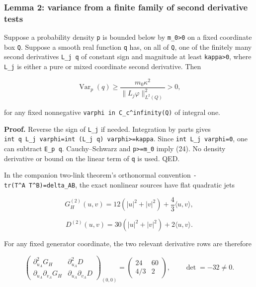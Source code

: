 \documentclass[
  11pt,
]{article}
\begin{document}
\hypertarget{lemma-2-variance-from-a-finite-family-of-second-derivative-tests}{%
\subsubsection{Lemma 2: variance from a finite family of second
derivative
tests}\label{lemma-2-variance-from-a-finite-family-of-second-derivative-tests}}

Suppose a probability density \texttt{p} is bounded below by
\texttt{m\_0\textgreater{}0} on a fixed coordinate box \texttt{Q}.
Suppose a smooth real function \texttt{q} has, on all of \texttt{Q}, one
of the finitely many second derivatives \texttt{L\_j\ q} of constant
sign and magnitude at least \texttt{kappa\textgreater{}0}, where
\texttt{L\_j} is either a pure or mixed coordinate second derivative.
Then

\[
 \operatorname{Var}_p(q)\ge
 \frac{m_0\kappa^2}{\|L_j\varphi\|_{L^2(Q)}^2}>0,
 \tag{24}
\]

for any fixed nonnegative \texttt{varphi\ in\ C\_c\^{}infinity(Q)} of
integral one.

\textbf{Proof.} Reverse the sign of \texttt{L\_j} if needed. Integration
by parts gives
\texttt{int\ q\ L\_j\ varphi=int\ (L\_j\ q)\ varphi\textgreater{}=kappa}.
Since \texttt{int\ L\_j\ varphi=0}, one can subtract \texttt{E\_p\ q}.
Cauchy--Schwarz and \texttt{p\textgreater{}=m\_0} imply (24). No density
derivative or bound on the linear term of \texttt{q} is used. QED.

In the companion two-link theorem's orthonormal convention
\texttt{-tr(T\^{}A\ T\^{}B)=delta\_AB}, the exact nonlinear sources have
flat quadratic jets

\[
 G_H^{(2)}(u,v)=12(|u|^2+|v|^2)+\frac43\langle u,v\rangle,
\]

\[
 D^{(2)}(u,v)=30(|u|^2+|v|^2)+2\langle u,v\rangle.
 \tag{25}
\]

For any fixed generator coordinate, the two relevant derivative rows are
therefore

\[
 \begin{pmatrix}
 \partial_{u_A}^2G_H&\partial_{u_A}^2D\\
 \partial_{u_A}\partial_{v_A}G_H&\partial_{u_A}\partial_{v_A}D
 \end{pmatrix}_{(0,0)}
 =\begin{pmatrix}24&60\\4/3&2\end{pmatrix},
 \qquad \det=-32\ne0.
 \tag{26}
\]
\end{document}
